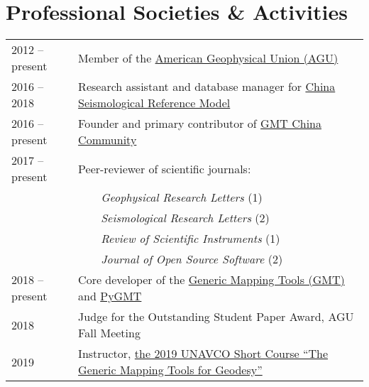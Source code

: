\section*{Professional Societies \& Activities}

\newcommand{\tabitem}{~~\llap{\textbullet}~~}

\begin{tabular}{ll}
2012 -- present & Member of the \href{https://sites.agu.org/}{American Geophysical Union (AGU)} \\
2016 -- 2018    & Research assistant and database manager for \href{http://chinageorefmodel.org/}{China Seismological Reference Model} \\
2016 -- present & Founder and primary contributor of \href{http://gmt-china.org/}{GMT China Community} \\
2017 -- present & Peer-reviewer of scientific journals: \\
                & \tabitem \textit{Geophysical Research Letters} (1) \\
                & \tabitem \textit{Seismological Research Letters} (2) \\
                & \tabitem \textit{Review of Scientific Instruments} (1) \\
                & \tabitem \textit{Journal of Open Source Software} (2) \\
2018 -- present & Core developer of the \href{https://github.com/GenericMappingTools/gmt}{Generic Mapping Tools (GMT)} and \href{https://github.com/GenericMappingTools/pygmt}{PyGMT} \\
2018 & Judge for the Outstanding Student Paper Award, AGU Fall Meeting \\
2019 & Instructor, \href{https://www.unavco.org/education/professional-development/short-courses/2019/geodetic-gmt/geodetic-gmt.html}{the 2019 UNAVCO Short Course ``The Generic Mapping Tools for Geodesy''} \\
\end{tabular}
